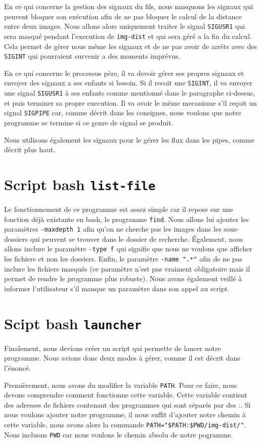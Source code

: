 \documentclass[french]{article}
\begin{document}
En ce qui concerne la gestion des signaux du fils, nous masquons les signaux qui peuvent bloquer son exécution afin de ne pas bloquer le calcul de la distance entre 
deux images. Nous allons alors uniquement traiter le signal \texttt{SIGUSR1} qui sera masqué pendant l'execution de \texttt{img-dist} et qui sera géré a la fin 
du calcul. Cela permet de gérer nous même les signaux et de ne pas avoir de arrêts avec des \texttt{SIGINT} qui pourraient survenir a des moments imprévus. 

En ce qui concerne le processus père, il va devoir gérer ses propres signaux et envoyer des signaux a ses enfants si besoin. Si il recoit une \texttt{SIGINT}, 
il va envoyer une signal \texttt{SIGUSR1} à ses enfants comme mentionné dans le paragraphe ci-dessus, et puis terminer sa propre execution. Il va avoir le même 
mecanisme s'il reçoit un signal \texttt{SIGPIPE} car, comme décrit dans les consignes, nous voulons que notre programme se termine si ce genre de signal 
se produit.

Nous utilisons également les signaux pour le gérer les flux dans les pipes, comme décrit plus haut.

\section{Script bash \texttt{list-file}}
Le fonctionnement de ce programme est assez simple car il repose sur une fonction déjà existante en bash, le programme \texttt{find}. Nous allons lui ajouter les paramètres 
\texttt{-maxdepth 1} afin qu'on ne cherche pas les images dans les sous-dossiers qui peuvent se trouver dans le dossier de recherche. Également, nous allons inclure 
le paramètre \texttt{-type f} qui signifie que nous ne voulons que afficher les fichiers et non les dossiers. Enfin, le paramètre \texttt{-name ".*"} afin de ne pas 
inclure les fichiers masqués (ce paramètre n'est pas vraiment obligatoire mais il permet de rendre le programme plus robuste). Nous avons également veillé à 
informer l'utilisateur s'il manque un paramètre dans son appel au script. 

\section{Scipt bash \texttt{launcher}}
Finalement, nous devions créer un script qui permette de lancer notre programme. Nous avions donc deux modes à gérer, comme il est décrit dans l'énoncé. 

Premièrement, nous avons du modifier la variable \texttt{PATH}. Pour ce faire, nous devons comprendre comment fonctionne cette variable. Cette variable contient des 
adresses de fichiers contenant des programmes qui sont séparés par des :. Si nous voulons ajouter notre programme, il nous suffit d'ajouter notre chemin à cette 
variable, nous avons alors la commande \texttt{PATH="\$PATH:\$PWD/img-dist/"}. Nous incluons \texttt{PWD} car nous voulons le chemin absolu de notre pogramme. 
\end{document}
